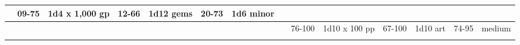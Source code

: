 \begin{longtable}{llllllllllllll}
{\begin{minipage}[t]{1.150in}
\end{minipage}} & \multicolumn{1}{|p{0.393in}|}{\begin{minipage}[t]{0.393in}\raggedright
09-75\end{minipage}} & \multicolumn{1}{p{0.469in}|}{\begin{minipage}[t]{0.469in}\raggedright
1d4 x 1,000 gp\end{minipage}} & \multicolumn{1}{p{0.923in}|}{\begin{minipage}[t]{0.923in}\raggedright
12-66\end{minipage}} & \multicolumn{1}{p{0.469in}|}{\begin{minipage}[t]{0.469in}\raggedright
1d12 gems\end{minipage}} & \multicolumn{1}{p{0.626in}|}{\begin{minipage}[t]{0.626in}\raggedright
20-73\end{minipage}} & \multicolumn{1}{p{0.469in}|}{\begin{minipage}[t]{0.469in}\centering
1d6 minor\end{minipage}}\\
\hline
\multicolumn{8}{p{1.150in}|}{\begin{minipage}[t]{1.150in}\centering
\end{minipage}} & \multicolumn{1}{|p{0.393in}|}{\begin{minipage}[t]{0.393in}\raggedright
76-100\end{minipage}} & \multicolumn{1}{p{0.469in}|}{\begin{minipage}[t]{0.469in}\raggedright
1d10 x 100 pp\end{minipage}} & \multicolumn{1}{p{0.923in}|}{\begin{minipage}[t]{0.923in}\raggedright
67-100\end{minipage}} & \multicolumn{1}{p{0.469in}|}{\begin{minipage}[t]{0.469in}\raggedright
1d10 art\end{minipage}} & \multicolumn{1}{p{0.626in}|}{\begin{minipage}[t]{0.626in}\raggedright
74-95\end{minipage}} & \multicolumn{1}{p{0.469in}|}{\begin{minipage}[t]{0.469in}\centering
1 medium\end{minipage}}\\
\hline
\multicolumn{8}{p{1.150in}|}{\begin{minipage}[t]{1.150in}\centering
\end{minipage}} & \multicolumn{1}{|p{0.393in}|}{\begin{minipage}[t]{0.393in}\raggedright

\end{minipage}}
\end{longtable}
